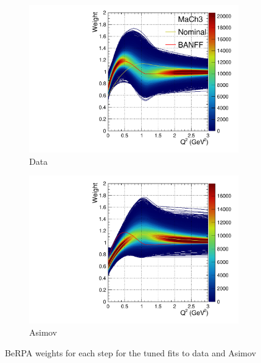 \begin{figure}[h]
	\begin{subfigure}[t]{0.49\textwidth}
		\includegraphics[width=\textwidth, trim={0mm 0mm 0mm 0mm}, clip,page=1]{figures/mach3/data/2017b_NewDet_3Xsec_4Det_5Flux_NewXSecTune_Data_0_BeRPA}
		\caption{Data}
	\end{subfigure}
	\begin{subfigure}[t]{0.49\textwidth}
		\includegraphics[width=\textwidth, trim={0mm 0mm 0mm 0mm}, clip,page=1]{figures/mach3/data/2017b_NewDet_3Xsec_4Det_5Flux_NewXSecTune_Asimov_0_BeRPA}
		\caption{Asimov}
	\end{subfigure}
\caption{BeRPA weights for each step for the tuned fits to data and Asimov}
\label{fig:berpa_data}
\end{figure}

